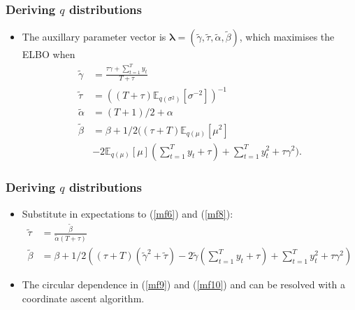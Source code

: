 \documentclass{beamer}\usepackage[]{graphicx}\usepackage[]{color}
\begin{document}
\begin{frame}
\frametitle{Deriving $q$ distributions}
\begin{itemize}
\item The auxillary parameter vector is $\boldsymbol{\lambda} = (\tilde{\gamma}, \tilde{\tau}, \tilde{\alpha}, \tilde{\beta})$, which maximises the ELBO when
\begin{align}
\tilde{\gamma} &= \frac{\tau \gamma + \sum_{t=1}^{T} y_t}{T + \tau}  \label{mf5} \\ 
\tilde{\tau} &= \left((T + \tau)\mathbb{E}_{q(\sigma^2)}[\sigma^{-2}]\right )^{-1} \label{mf6} \\
\tilde{\alpha} &= (T+1)/2 + \alpha  \label{mf7} \\
\tilde{\beta} &= \beta + 1/2\bigg((\tau + T)\mathbb{E}_{q(\mu)}[\mu^2 ]  \nonumber \\ 
&- 2 \mathbb{E}_{q(\mu)}[\mu ]\left(\sum_{t=1}^{T}y_t + \tau\right) + \sum_{t=1}^{T} y_t^2 + \tau \gamma^2 \bigg). \label{mf8}
\end{align}
\end{itemize}
\end{frame}


\begin{frame}
\frametitle{Deriving $q$ distributions}
\begin{itemize}
\item Substitute in expectations to (\ref{mf6}) and (\ref{mf8}):
\begin{align}
\tilde{\tau} &= \frac{\tilde{\beta}}{\tilde{\alpha}(T + \tau)} \label{mf9} \\
\tilde{\beta} &= \beta + 1/2\left((\tau + T)(\tilde{\gamma}^2 + \tilde{\tau}) - 2 \tilde{\gamma}(\sum_{t=1}^{T}y_t + \tau) + \sum_{t=1}^{T} y_t^2 + \tau \gamma^2 \right)\label{mf10}
\end{align}
\item The circular dependence in (\ref{mf9}) and (\ref{mf10}) and can be resolved with a coordinate ascent algorithm.
\end{itemize}
\end{frame}
\end{document}
